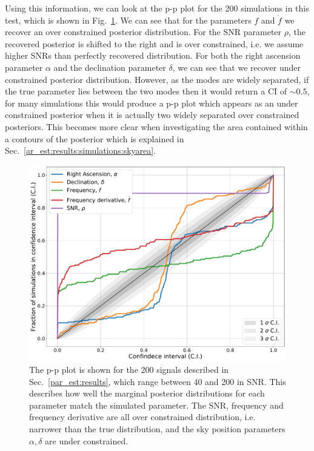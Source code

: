 Using this information, we can look at the p-p plot for the 200 simulations in this test, which is shown in Fig.~\ref{par_est:results:ppplot}.
We can see that for the parameters $f$ and $\dot{f}$ we recover an over constrained posterior distribution.
For the \gls{SNR} parameter $\rho$, the recovered posterior is shifted to the right and is over constrained, i.e. we assume higher \glspl{SNR} than perfectly recovered distribution.
For both the right ascension parameter $\alpha$ and the declination parameter $\delta$, we can see that we recover under constrained posterior distribution.
However, as the modes are widely separated, if the true parameter lies between the two modes then it would return a \gls{CI} of $\sim 0.5$, for many simulations this would produce a p-p plot which appears as an under constrained posterior when it is actually two widely separated over constrained posteriors.
This becomes more clear when investigating the area contained within a contours of the posterior which is explained in Sec.~\ref{ar_est:results:simulations:skyarea}.
%
\begin{figure}[ht]
    \centering
    \includegraphics[width=\linewidth]{C5_parameter/ppplot.pdf}
    \caption[p-p plot for the CW simulations]{The p-p plot is shown for the 200 signals described in Sec.~\ref{par_est:results}, which range between 40 and 200 in \gls{SNR}. This describes how well the marginal posterior distributions for each parameter match the simulated parameter. The \gls{SNR}, frequency and frequency derivative are all over constrained distribution, i.e. narrower than the true distribution, and the sky position parameters $\alpha,\delta$ are under constrained.}
    \label{par_est:results:ppplot}
\end{figure}

